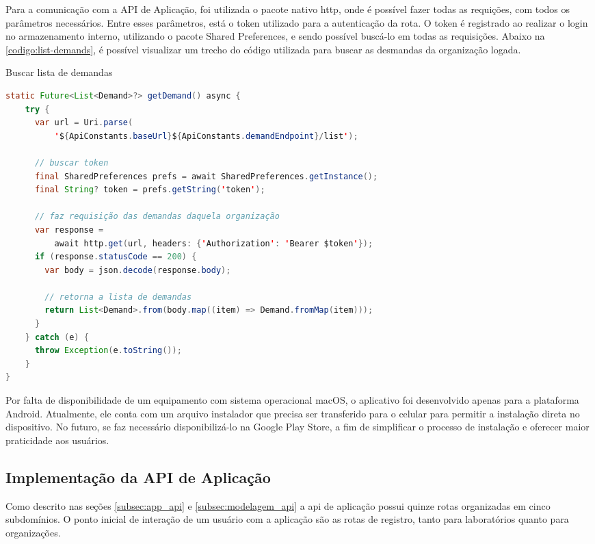 Para a comunicação com a API de Aplicação, foi utilizada o pacote nativo http, onde é possível fazer todas as requições, com todos os parâmetros necessários. Entre esses parâmetros, está o token utilizado para a autenticação da rota. O token é registrado ao realizar o login no armazenamento interno, utilizando o pacote Shared Preferences, e sendo possível buscá-lo em todas as requisições. Abaixo na \autoref{codigo:list-demands}, é possível visualizar um trecho do código utilizada para buscar as desmandas da organização logada.

\begin{sourcecode}[htb]
  \caption{\label{codigo:list-demands}Buscar lista de demandas}
  \begin{lstlisting}[frame=single, language=Java]
static Future<List<Demand>?> getDemand() async {
    try {
      var url = Uri.parse(
          '${ApiConstants.baseUrl}${ApiConstants.demandEndpoint}/list');
		  
	  // buscar token
      final SharedPreferences prefs = await SharedPreferences.getInstance();
      final String? token = prefs.getString('token');
	  
	  // faz requisição das demandas daquela organização
      var response =
          await http.get(url, headers: {'Authorization': 'Bearer $token'});
      if (response.statusCode == 200) {
        var body = json.decode(response.body);

		// retorna a lista de demandas
        return List<Demand>.from(body.map((item) => Demand.fromMap(item)));
      }
    } catch (e) {
	  throw Exception(e.toString());
    }
}
\end{lstlisting}
  \fonte{}
\end{sourcecode}

Por falta de disponibilidade de um equipamento com sistema operacional macOS, o aplicativo foi desenvolvido apenas para a plataforma Android. Atualmente, ele conta com um arquivo instalador que precisa ser transferido para o celular para permitir a instalação direta no dispositivo. No futuro, se faz necessário disponibilizá-lo na Google Play Store, a fim de simplificar o processo de instalação e oferecer maior praticidade aos usuários.

\subsection{Implementação da API de Aplicação}\label{subsec:api-aplicacao}

Como descrito nas seções \ref{subsec:app_api} e \ref{subsec:modelagem_api} a \gls{api} de aplicação possui quinze rotas organizadas em cinco subdomínios. O ponto inicial de interação de um usuário com a aplicação são as rotas de registro, tanto para laboratórios quanto para organizações.

